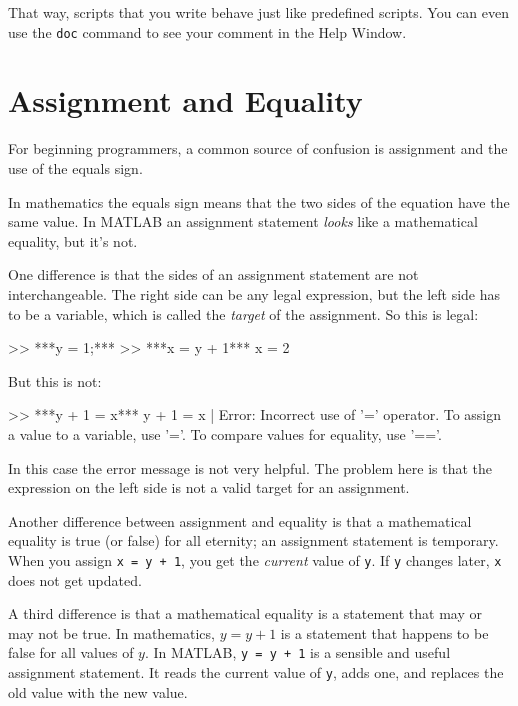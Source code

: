 That way, scripts that you write behave just like predefined scripts.
You can even use the \lstinline{doc} command to see your comment in the
Help Window.


\section{Assignment and Equality}

For beginning programmers, a common source of confusion is assignment and the use of the equals sign.


In mathematics the equals sign means that the two sides of the
equation have the same value.
In MATLAB an assignment statement {\em looks} like a mathematical equality, but it's not.

One difference is that the sides of an assignment statement are not
interchangeable.  The right side can be any legal expression, but
the left side has to be a variable, which is called the 
{\em target} of the assignment.  So this is legal:

\begin{code}
>> ***y = 1;***
>> ***x = y + 1***
x = 2
\end{code}

But this is not:

\begin{code}
>> ***y + 1 = x***
 y + 1 = x
       |
Error: Incorrect use of '=' operator. 
To assign a value to a variable, use '='. 
To compare values for equality, use '=='.
\end{code}

In this case the error message is not very helpful.  The problem here is that the expression on the left side is not a valid target for an assignment.


Another difference between assignment and equality is that a mathematical equality is true (or false) for all eternity;
an assignment statement is temporary.
When you assign \lstinline{x = y + 1}, you get the
{\em current} value of \lstinline{y}.  If \lstinline{y} changes later, \lstinline{x}
does not get updated.

A third difference is that a mathematical equality is a statement that
may or may not be true.  In mathematics, $y = y+1$ is a statement that
happens to be false for all values of $y$.  
In MATLAB, \lstinline{y = y + 1} is a sensible and useful assignment statement.
It reads the current value of \lstinline{y}, adds one, and replaces the old value with the new value.

